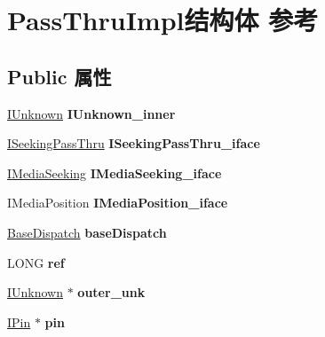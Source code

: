 \hypertarget{struct_pass_thru_impl}{}\section{Pass\+Thru\+Impl结构体 参考}
\label{struct_pass_thru_impl}
\subsection*{Public 属性}
\begin{DoxyCompactItemize}
\item 
\mbox{\label{struct_pass_thru_impl_a69a9ea6053f83e01f4719b910f5b99e8}} 
\hyperlink{interface_i_unknown}{I\+Unknown} {\bfseries I\+Unknown\+\_\+inner}
\item 
\mbox{\label{struct_pass_thru_impl_a76ed9a5a6aa13aa2ac9827aee523890e}} 
\hyperlink{interface_i_seeking_pass_thru}{I\+Seeking\+Pass\+Thru} {\bfseries I\+Seeking\+Pass\+Thru\+\_\+iface}
\item 
\mbox{\label{struct_pass_thru_impl_ae5d6f833a895f2d836448779afe14e2e}} 
\hyperlink{interface_i_media_seeking}{I\+Media\+Seeking} {\bfseries I\+Media\+Seeking\+\_\+iface}
\item 
\mbox{\label{struct_pass_thru_impl_aabe778cb0f70f8d408a21f9211a32e54}} 
I\+Media\+Position {\bfseries I\+Media\+Position\+\_\+iface}
\item 
\mbox{\label{struct_pass_thru_impl_a04870de64c47715632245e0f0aa501d1}} 
\hyperlink{struct_base_dispatch}{Base\+Dispatch} {\bfseries base\+Dispatch}
\item 
\mbox{\label{struct_pass_thru_impl_a08fc8431f3b7c60a5f9f216e975446e7}} 
L\+O\+NG {\bfseries ref}
\item 
\mbox{\label{struct_pass_thru_impl_a7f608f387535aeaa60e15f42abbea59b}} 
\hyperlink{interface_i_unknown}{I\+Unknown} $\ast$ {\bfseries outer\+\_\+unk}
\item 
\mbox{\label{struct_pass_thru_impl_af5eba2506e94bf9102b37aa073f1935e}} 
\hyperlink{interface_i_pin}{I\+Pin} $\ast$ {\bfseries pin}

\end{DoxyCompactItemize}
